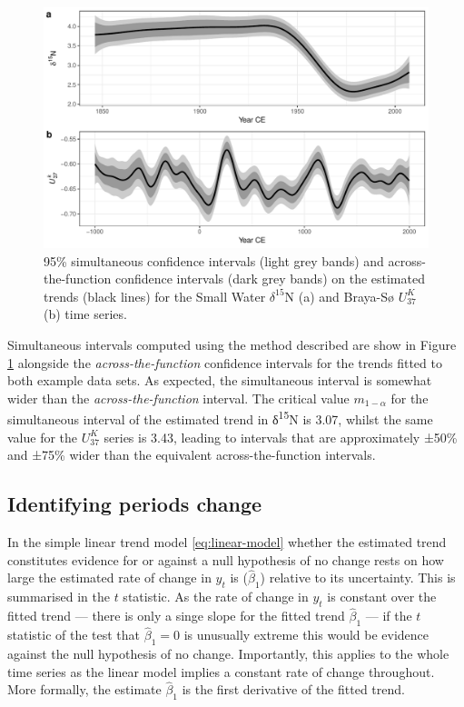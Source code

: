 \documentclass[12pt,]{article}
\newcommand{\uk}{\ensuremath{\mathit{U}^{\mathit{K}}_{\mathup{37}}}}
\begin{document}
\begin{figure}

{\centering \includegraphics[width=0.8\linewidth]{manuscript_files/figure-latex/compare-intervals-1} 

}

\caption{95\% simultaneous confidence intervals (light grey bands) and across-the-function confidence intervals (dark grey bands) on the estimated trends (black lines) for the Small Water $\delta^{15}\text{N}$ (a) and Braya-Sø \uk{} (b) time series.}\label{fig:compare-intervals}
\end{figure}

Simultaneous intervals computed using the method described are show in
Figure \ref{fig:compare-intervals} alongside the
\emph{across-the-function} confidence intervals for the trends fitted to
both example data sets. As expected, the simultaneous interval is
somewhat wider than the \emph{across-the-function} interval. The
critical value \(m_{1-\alpha}\) for the simultaneous interval of the
estimated trend in δ\textsuperscript{15}N is 3.07, whilst the same value
for the \uk{} series is 3.43, leading to intervals that are
approximately ±50\% and ±75\% wider than the equivalent
across-the-function intervals.

\subsection{Identifying periods
change}\label{identifying-periods-change}

In the simple linear trend model \eqref{eq:linear-model} whether the
estimated trend constitutes evidence for or against a null hypothesis of
no change rests on how large the estimated rate of change in \(y_t\) is
(\(\hat{\beta}_1\)) relative to its uncertainty. This is summarised in
the \(t\) statistic. As the rate of change in \(y_t\) is constant over
the fitted trend --- there is only a singe slope for the fitted trend
\(\hat{\beta}_1\) --- if the \(t\) statistic of the test that
\(\hat{\beta}_1 = 0\) is unusually extreme this would be evidence
against the null hypothesis of no change. Importantly, this applies to
the whole time series as the linear model implies a constant rate of
change throughout. More formally, the estimate \(\hat{\beta}_1\) is the
first derivative of the fitted trend.
\end{document}
